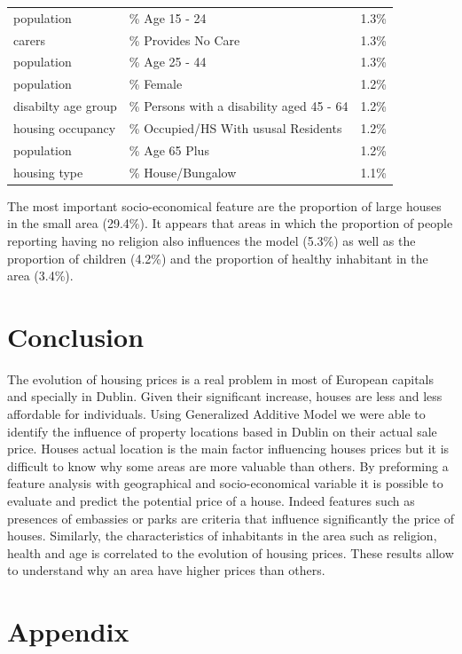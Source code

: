 \documentclass[]{elsarticle} %
\begin{document}
\begin{table}[!h]
\begin{tabular}{>{\raggedright\arraybackslash}p{1in}>{\raggedright\arraybackslash}p{3in}l}
population & \% Age 15 - 24 & 1.3\%\\
carers & \% Provides No Care & 1.3\%\\
population & \% Age 25 - 44 & 1.3\%\\
population & \% Female & 1.2\%\\
disabilty age group & \% Persons with a disability aged 45 - 64 & 1.2\%\\
housing occupancy & \% Occupied/HS With ususal Residents & 1.2\%\\
population & \% Age 65 Plus & 1.2\%\\
housing type & \% House/Bungalow & 1.1\%\\
\bottomrule
\end{tabular}
\end{table}

The most important socio-economical feature are the proportion of large
houses in the small area (29.4\%). It appears that areas in which the
proportion of people reporting having no religion also influences the
model (5.3\%) as well as the proportion of children (4.2\%) and the
proportion of healthy inhabitant in the area (3.4\%).

\hypertarget{conclusion}{%
\section{Conclusion}\label{conclusion}}

The evolution of housing prices is a real problem in most of European
capitals and specially in Dublin. Given their significant increase,
houses are less and less affordable for individuals. Using Generalized
Additive Model we were able to identify the influence of property
locations based in Dublin on their actual sale price. Houses actual
location is the main factor influencing houses prices but it is
difficult to know why some areas are more valuable than others. By
preforming a feature analysis with geographical and socio-economical
variable it is possible to evaluate and predict the potential price of a
house. Indeed features such as presences of embassies or parks are
criteria that influence significantly the price of houses. Similarly,
the characteristics of inhabitants in the area such as religion, health
and age is correlated to the evolution of housing prices. These results
allow to understand why an area have higher prices than others.

\hypertarget{appendix}{%
\section{Appendix}\label{appendix}}
\end{document}
